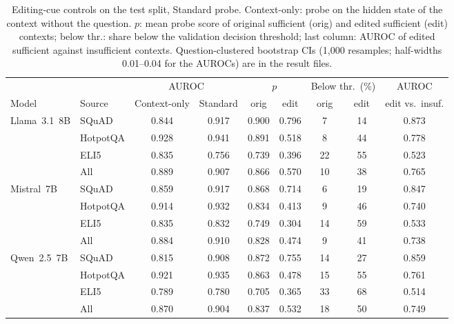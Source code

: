 \documentclass[acmsmall,screen,review]{acmart}
\begin{document}
\begin{table}[t]
\caption{Editing-cue controls on the test split, Standard probe. Context-only: probe on the hidden state of the context without the question. $p$: mean probe score of original sufficient (orig) and edited sufficient (edit) contexts; below thr.: share below the validation decision threshold; last column: AUROC of edited sufficient against insufficient contexts. Question-clustered bootstrap CIs (1,000 resamples; half-widths 0.01--0.04 for the AUROCs) are in the result files.}
\label{tab:splice}
\footnotesize
\setlength{\tabcolsep}{4pt}
\begin{tabular}{llccccccc}
\toprule
 & & \multicolumn{2}{c}{AUROC} & \multicolumn{2}{c}{$p$} & \multicolumn{2}{c}{Below thr.\ (\%)} & AUROC \\
\cmidrule(lr){3-4}\cmidrule(lr){5-6}\cmidrule(lr){7-8}
Model & Source & Context-only & Standard & orig & edit & orig & edit & edit vs.\ insuf. \\
\midrule
  Llama~3.1~8B & SQuAD & 0.844 & 0.917 & 0.900 & 0.796 & 7 & 14 & 0.873 \\
   & HotpotQA & 0.928 & 0.941 & 0.891 & 0.518 & 8 & 44 & 0.778 \\
   & ELI5 & 0.835 & 0.756 & 0.739 & 0.396 & 22 & 55 & 0.523 \\
   & All & 0.889 & 0.907 & 0.866 & 0.570 & 10 & 38 & 0.765 \\
  \addlinespace
  Mistral~7B & SQuAD & 0.859 & 0.917 & 0.868 & 0.714 & 6 & 19 & 0.847 \\
   & HotpotQA & 0.914 & 0.932 & 0.834 & 0.413 & 9 & 46 & 0.740 \\
   & ELI5 & 0.835 & 0.832 & 0.749 & 0.304 & 14 & 59 & 0.533 \\
   & All & 0.884 & 0.910 & 0.828 & 0.474 & 9 & 41 & 0.738 \\
  \addlinespace
  Qwen~2.5~7B & SQuAD & 0.815 & 0.908 & 0.872 & 0.755 & 14 & 27 & 0.859 \\
   & HotpotQA & 0.921 & 0.935 & 0.863 & 0.478 & 15 & 55 & 0.761 \\
   & ELI5 & 0.789 & 0.780 & 0.705 & 0.365 & 33 & 68 & 0.514 \\
   & All & 0.870 & 0.904 & 0.837 & 0.532 & 18 & 50 & 0.749 \\
\bottomrule
\end{tabular}
\end{table}
\end{document}
